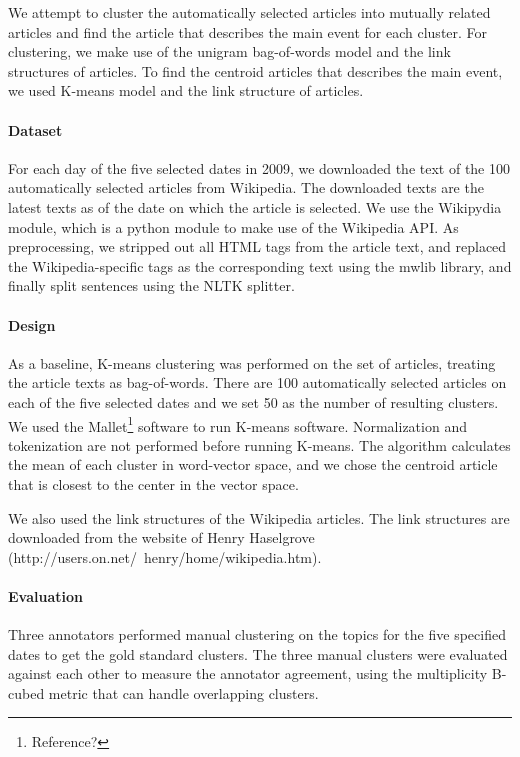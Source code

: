 \documentclass[11pt]{article}
\begin{document}
We attempt to cluster the automatically selected articles into mutually related articles and find the article that describes the main event for each cluster. For clustering, we make use of the unigram bag-of-words model and the link structures of articles. To find the centroid articles that describes the main event, we used K-means model and the link structure of articles.

\paragraph{Dataset} For each day of the five selected dates in 2009, we downloaded the text of the 100 automatically selected articles from Wikipedia. The downloaded texts are the latest texts as of the date on which the article is selected. We use the Wikipydia module, which is a python module to make use of the Wikipedia API. As preprocessing, we stripped out all HTML tags from the article text, and replaced the Wikipedia-specific tags as the corresponding text using the mwlib library, and finally split sentences using the NLTK splitter.

\paragraph{Design}
As a baseline, K-means clustering was performed on the set of articles, treating the article texts as bag-of-words. There are 100 automatically selected articles on each of the five selected dates and we set 50 as the number of resulting clusters. We used the Mallet\footnote{Reference?} software to run K-means software. Normalization and tokenization are not performed before running K-means. The algorithm calculates the mean of each cluster in word-vector space, and we chose the centroid article that is closest to the center in the vector space.

We also used the link structures of the Wikipedia articles. The link structures are downloaded from the website of Henry Haselgrove (http://users.on.net/~henry/home/wikipedia.htm).

\paragraph{Evaluation}
Three annotators performed manual clustering on the topics for the five specified dates to get the gold standard clusters.
The three manual clusters were evaluated against each other to measure the annotator agreement,
using the multiplicity B-cubed metric\cite{amigo09} that can handle overlapping clusters.
\end{document}
